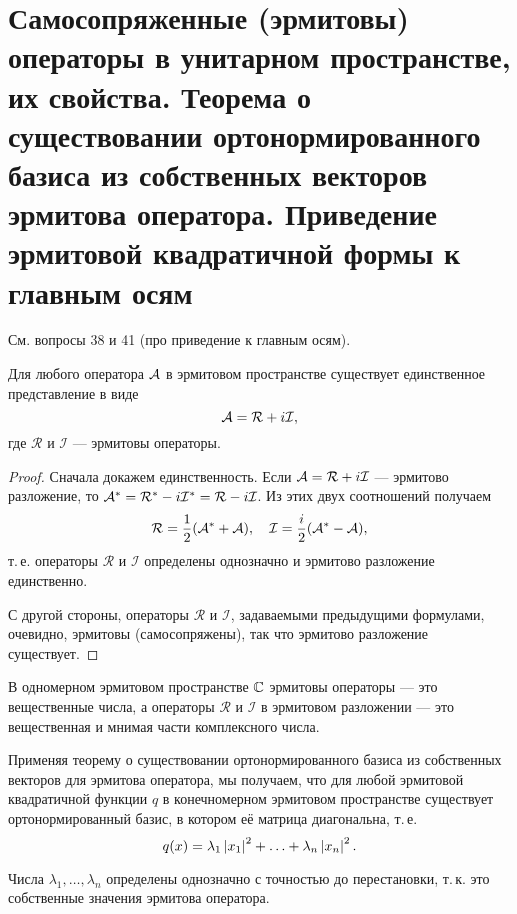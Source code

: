 \section{Самосопряженные (эрмитовы) операторы в унитарном пространстве, их свойства. Теорема о существовании ортонормированного базиса из собственных векторов эрмитова оператора. Приведение эрмитовой квадратичной формы к главным осям}

См. вопросы 38 и 41 (про приведение к главным осям).

\begin{theorem}
    Для любого оператора $\mathcal{A}$ в эрмитовом пространстве существует единственное представление в виде
    \[
        \mathcal{A} = \mathcal{R} + i\mathcal{I},
    \]
    где $\mathcal{R}$ и $\mathcal{I}$ --- эрмитовы операторы.
\end{theorem}

\begin{proof}
    Сначала докажем единственность. Если $\mathcal{A} = \mathcal{R} + i\mathcal{I}$ --- эрмитово разложение, то $\mathcal{A}^\ast = \mathcal{R}^\ast - i\mathcal{I}^\ast = \mathcal{R} - i\mathcal{I}$. Из этих двух соотношений получаем
    \[
        \mathcal{R} = \frac{1}{2}(\mathcal{A}^\ast + \mathcal{A}),\quad\mathcal{I} = \frac{i}{2}(\mathcal{A}^\ast - \mathcal{A}),
    \]
    т.\,е. операторы $\mathcal{R}$ и $\mathcal{I}$ определены однозначно и эрмитово разложение единственно.

    С другой стороны, операторы $\mathcal{R}$ и $\mathcal{I}$, задаваемыми предыдущими формулами, очевидно, эрмитовы (самосопряжены), так что эрмитово разложение существует.
\end{proof}

В одномерном эрмитовом пространстве $\mathbb{C}$ эрмитовы операторы --- это вещественные числа, а операторы $\mathcal{R}$ и $\mathcal{I}$ в эрмитовом разложении --- это вещественная и мнимая части комплексного числа.

Применяя теорему о существовании ортонормированного базиса из собственных векторов для эрмитова оператора, мы получаем, что для любой эрмитовой квадратичной функции $q$ в конечномерном эрмитовом пространстве существует ортонормированный базис, в котором её матрица диагональна, т.\,е.
\[
    q(x) = \lambda_1\left\lvert x_1\right\rvert^2 + \ldots + \lambda_n\left\lvert x_n\right\rvert^2.
\]

Числа $\lambda_1, \ldots, \lambda_n$ определены однозначно с точностью до перестановки, т.\,к. это собственные значения эрмитова оператора.

